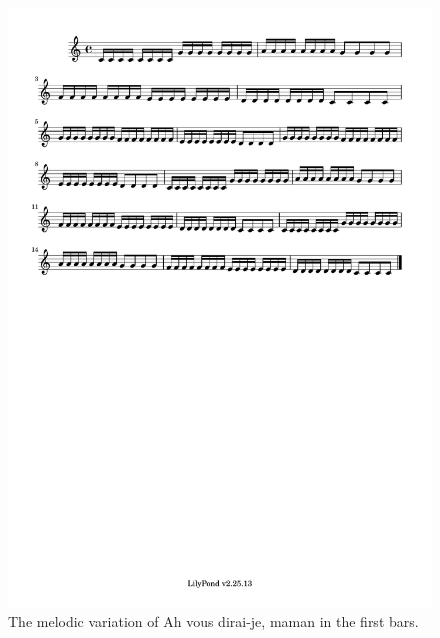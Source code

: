 \documentclass[11pt]{article}
\theoremstyle{definition}
\begin{document}
\begin{figure}
\centering
\includegraphics[trim=1cm 26.5cm 8.615cm 0.5cm, clip, scale=0.6]{melody_variation.pdf}
\caption{The melodic variation of Ah vous dirai-je, maman in the first bars.}
\label{fig:MV2}
\end{figure}
\end{document}
